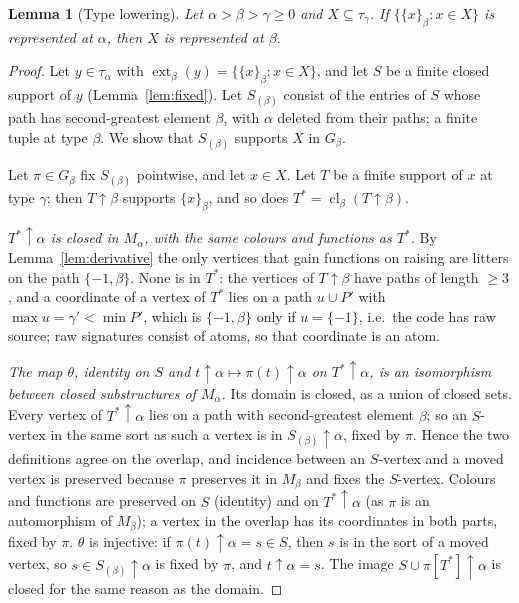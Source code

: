 \documentclass[11pt]{article}
\newtheorem{lemma}[theorem]{Lemma}
\theoremstyle{definition}
\theoremstyle{remark}
\newcommand{\cl}{\operatorname{cl}}
\newcommand{\ext}{\operatorname{ext}}
\newcommand{\up}{\!\uparrow\!}
\begin{document}
\begin{lemma}[Type lowering]\label{lem:lower}
Let \(\alpha>\beta>\gamma\geq0\) and \(X\subseteq\tau_\gamma\). If
\(\{\{x\}_\beta:x\in X\}\) is represented at \(\alpha\), then \(X\) is
represented at \(\beta\).
\end{lemma}
\begin{proof}
Let \(y\in\tau_\alpha\) with \(\ext_\beta(y)=\{\{x\}_\beta:x\in X\}\), and
let \(S\) be a finite closed support of \(y\) (Lemma~\ref{lem:fixed}). Let
\(S_{(\beta)}\) consist of the entries of \(S\) whose path has
second-greatest element \(\beta\), with \(\alpha\) deleted from their
paths; a finite tuple at type \(\beta\). We show that \(S_{(\beta)}\)
supports \(X\) in \(G_\beta\).

Let \(\pi\in G_\beta\) fix \(S_{(\beta)}\) pointwise, and let \(x\in X\).
Let \(T\) be a finite support of \(x\) at type \(\gamma\); then
\(T\up\beta\) supports \(\{x\}_\beta\), and so does \(T^*=\cl_\beta(T\up
\beta)\).

\emph{\(T^*\up\alpha\) is closed in \(M_\alpha\), with the same colours and
functions as \(T^*\).} By Lemma~\ref{lem:derivative} the only vertices
that gain functions on raising are litters on the path \(\{-1,\beta\}\).
None is in \(T^*\): the vertices of \(T\up\beta\) have paths of length
\(\geq3\), and a coordinate of a vertex of \(T^*\) lies on a path
\(u\cup P'\) with \(\max u=\gamma'<\min P'\), which is \(\{-1,\beta\}\)
only if \(u=\{-1\}\), i.e.\ the code has raw source; raw signatures
consist of atoms, so that coordinate is an atom.

\emph{The map \(\theta\), identity on \(S\) and \(t\up\alpha\mapsto
\pi(t)\up\alpha\) on \(T^*\up\alpha\), is an isomorphism between closed
substructures of \(M_\alpha\).} Its domain is closed, as a union of closed
sets. Every vertex of \(T^*\up\alpha\) lies on a path with second-greatest
element \(\beta\); so an \(S\)-vertex in the same sort as such a vertex is
in \(S_{(\beta)}\up\alpha\), fixed by \(\pi\). Hence the two definitions
agree on the overlap, and incidence between an \(S\)-vertex and a moved
vertex is preserved because \(\pi\) preserves it in \(M_\beta\) and fixes
the \(S\)-vertex. Colours and functions are preserved on \(S\) (identity)
and on \(T^*\up\alpha\) (as \(\pi\) is an automorphism of \(M_\beta\)); a
vertex in the overlap has its coordinates in both parts, fixed by \(\pi\).
\(\theta\) is injective: if \(\pi(t)\up\alpha=s\in S\), then \(s\) is in
the sort of a moved vertex, so \(s\in S_{(\beta)}\up\alpha\) is fixed by
\(\pi\), and \(t\up\alpha=s\). The image \(S\cup\pi[T^*]\up\alpha\) is
closed for the same reason as the domain.


\end{proof}
\end{document}
